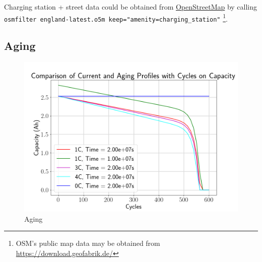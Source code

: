 \documentclass[12pt, a4paper]{article}
\begin{document}
  Charging station + street data could be obtained from \href{https://osm.org/}{OpenStreetMap} by calling \\
  \texttt{osmfilter england-latest.o5m \-\-keep="amenity=charging\_station"} \footnote{OSM's public map data may be obtained from \url{https://download.geofabrik.de/}}.



  \subsection{Aging}
  \begin{figure}[H]
    \centering
    \includegraphics[width=0.7\linewidth]{figures/aging.png}
    \caption{Aging}
    \label{fig:aging}
  \end{figure}
\end{document}
